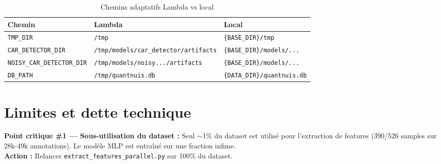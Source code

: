 \documentclass[11pt,a4paper]{article}
\newcommand{\code}[1]{\texttt{\small #1}}
\begin{document}
\begin{table}[htbp]
\centering
\begin{tabular}{@{}lll@{}}
\toprule
\textbf{Chemin} & \textbf{Lambda} & \textbf{Local} \\
\midrule
\code{TMP\_DIR} & \code{/tmp} & \code{\{BASE\_DIR\}/tmp} \\
\code{CAR\_DETECTOR\_DIR} & \code{/tmp/models/car\_detector/artifacts} & \code{\{BASE\_DIR\}/models/...} \\
\code{NOISY\_CAR\_DETECTOR\_DIR} & \code{/tmp/models/noisy.../artifacts} & \code{\{BASE\_DIR\}/models/...} \\
\code{DB\_PATH} & \code{/tmp/quantnuis.db} & \code{\{DATA\_DIR\}/quantnuis.db} \\
\bottomrule
\end{tabular}
\caption{Chemins adaptatifs Lambda vs local}
\end{table}

\section{Limites et dette technique}

\begin{warningbox}
\textbf{Point critique \#1 — Sous-utilisation du dataset :}
Seul $\sim$1\% du dataset est utilisé pour l'extraction de features (390/526 samples
sur 28k-49k annotations). Le modèle MLP est entraîné sur une fraction infime.\\[4pt]
\textbf{Action :} Relancer \code{extract\_features\_parallel.py} sur 100\% du dataset.
\end{warningbox}
\end{document}
